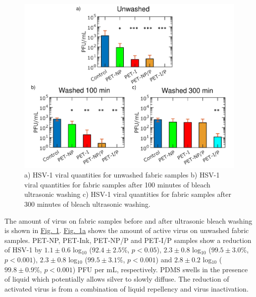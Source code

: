 \documentclass[journal=jacsat,manuscript=article]{achemso}
\newcommand{\figref}[2][]{\hyperref[#2]{Fig.~\ref{#2}#1}}
\begin{document}
\begin{figure}[H]
       \centering
    \includegraphics[width= \linewidth]{Figures/fig_virus.pdf}
\caption[Virus]{a) HSV-1 viral quantities for unwashed fabric samples b) HSV-1 viral quantities for fabric samples after 100 minutes of bleach ultrasonic washing c) HSV-1 viral quantities for fabric samples after 300 minutes of bleach ultrasonic washing. %
}

\label{fig:virus}
\end{figure}


The amount of virus on fabric samples before and after ultrasonic bleach washing is shown in \figref{fig:virus}. \figref[a]{fig:virus} shows the amount of active virus on unwashed fabric samples. PET-NP, PET-Ink, PET-NP/P and PET-I/P samples show a reduction of HSV-1 by $1.1 \pm 0.6$ log$_{10}$ ($92.4 \pm 2.5 \%$, $p < 0.05$), $2.3 \pm 0.8$ log$_{10}$ ($99.5 \pm 3.0 \%$, $p < 0.001$), $2.3 \pm 0.8$  log$_{10}$ ($99.5 \pm 3.1 \%$, $p < 0.001$) and $2.8 \pm 0.2$ log$_{10}$ ($99.8 \pm 0.9 \%$, $p < 0.001$) PFU per mL, respectively. 
PDMS swells in the presence of liquid which potentially allows silver to slowly diffuse.\cite{bian_2021,ahmad_2021}
The reduction of activated virus is from a combination of liquid repellency and virus inactivation.  
\end{document}
